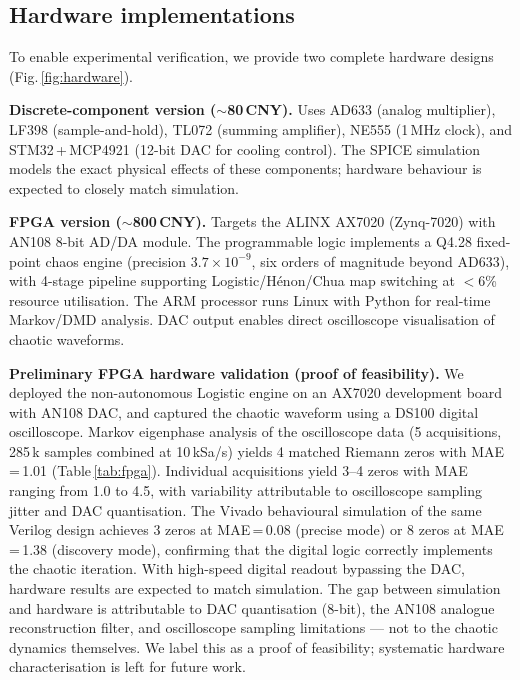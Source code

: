 \documentclass[11pt]{article}
\begin{document}
\subsection*{Hardware implementations}

To enable experimental verification, we provide two complete hardware designs (Fig.\,\ref{fig:hardware}).

\textbf{Discrete-component version ($\sim$80\,CNY).} Uses AD633 (analog multiplier), LF398 (sample-and-hold), TL072 (summing amplifier), NE555 (1\,MHz clock), and STM32\,+\,MCP4921 (12-bit DAC for cooling control). The SPICE simulation models the exact physical effects of these components; hardware behaviour is expected to closely match simulation.

\textbf{FPGA version ($\sim$800\,CNY).} Targets the ALINX AX7020 (Zynq-7020) with AN108 8-bit AD/DA module. The programmable logic implements a Q4.28 fixed-point chaos engine (precision $3.7 \times 10^{-9}$, six orders of magnitude beyond AD633), with 4-stage pipeline supporting Logistic/H\'enon/Chua map switching at $<$6\% resource utilisation. The ARM processor runs Linux with Python for real-time Markov/DMD analysis. DAC output enables direct oscilloscope visualisation of chaotic waveforms.

\textbf{Preliminary FPGA hardware validation (proof of feasibility).} We deployed the non-autonomous Logistic engine on an AX7020 development board with AN108 DAC, and captured the chaotic waveform using a DS100 digital oscilloscope. Markov eigenphase analysis of the oscilloscope data (5 acquisitions, 285\,k samples combined at 10\,kSa/s) yields 4 matched Riemann zeros with MAE\,=\,1.01 (Table\,\ref{tab:fpga}). Individual acquisitions yield 3--4 zeros with MAE ranging from 1.0 to 4.5, with variability attributable to oscilloscope sampling jitter and DAC quantisation. The Vivado behavioural simulation of the same Verilog design achieves 3 zeros at MAE\,=\,0.08 (precise mode) or 8 zeros at MAE\,=\,1.38 (discovery mode), confirming that the digital logic correctly implements the chaotic iteration. With high-speed digital readout bypassing the DAC, hardware results are expected to match simulation. The gap between simulation and hardware is attributable to DAC quantisation (8-bit), the AN108 analogue reconstruction filter, and oscilloscope sampling limitations --- not to the chaotic dynamics themselves. We label this as a proof of feasibility; systematic hardware characterisation is left for future work.
\end{document}
